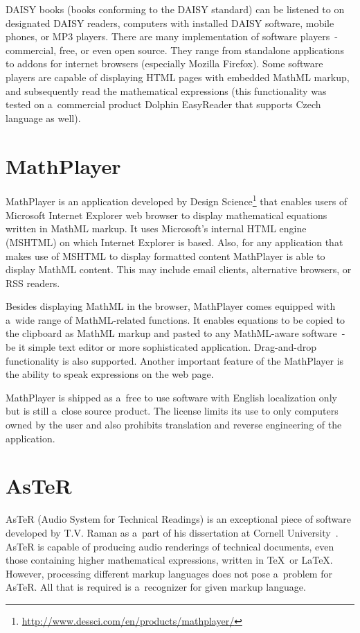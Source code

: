 \documentclass[11pt,oneside,final]{fithesis2}
\begin{document}
DAISY books (books conforming to the DAISY standard) can be listened to on designated DAISY readers, computers with installed DAISY software, mobile phones, or MP3 players. There are many implementation of software players~- commercial, free, or even open source. They range from standalone applications to addons for internet browsers (especially Mozilla Firefox). Some software players are capable of displaying HTML pages with embedded MathML markup, and subsequently read the mathematical expressions (this functionality was tested on a~commercial product Dolphin EasyReader that supports Czech language as well).   

\section{MathPlayer}
\label{mathml:mathplayer}
MathPlayer is an application developed by Design Science\footnote{\url{http://www.dessci.com/en/products/mathplayer/}} that enables users of Microsoft Internet Explorer web browser to display mathematical equations written in MathML markup. It uses Microsoft's internal HTML engine (MSHTML) on which Internet Explorer is based. Also, for any application that makes use of MSHTML to display formatted content MathPlayer is able to display MathML content. This may include email clients, alternative browsers, or RSS readers. 

Besides displaying MathML in the browser, MathPlayer comes equipped with a~wide range of MathML-related functions. It enables equations to be copied to the clipboard as MathML markup and pasted to any MathML-aware software~- be it simple text editor or more sophisticated application. Drag-and-drop functionality is also supported. Another important feature of the MathPlayer is the ability to speak expressions on the web page.

MathPlayer is shipped as a~free to use software with English localization only but is still a~close source product. The license limits its use to only computers owned by the user and also prohibits translation and reverse engineering of the application.

\section{AsTeR}
AsTeR (Audio System for Technical Readings) is an exceptional piece of software developed by T.V. Raman as a~part of his dissertation at Cornell University~\cite{aster1994}. AsTeR is capable of producing audio renderings of technical documents, even those containing higher mathematical expressions, written in \TeX\ or \LaTeX. However, processing different markup languages does not pose a~problem for AsTeR. All that is required is a~recognizer for given markup language. 
\end{document}
